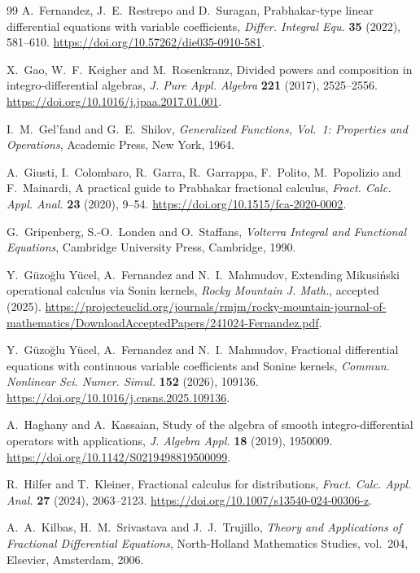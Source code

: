 \documentclass[11pt]{article}
\numberwithin{equation}{section}
\theoremstyle{definition}
\theoremstyle{remark}
\begin{document}
\begin{thebibliography}{99}
A.~Fernandez, J.~E.~Restrepo and D.~Suragan,
Prabhakar-type linear differential equations with variable coefficients,
\emph{Differ. Integral Equ.} \textbf{35} (2022), 581--610.
\url{https://doi.org/10.57262/die035-0910-581}.

X.~Gao, W.~F.~Keigher and M.~Rosenkranz,
Divided powers and composition in integro-differential algebras,
\emph{J. Pure Appl. Algebra} \textbf{221} (2017), 2525--2556.
\url{https://doi.org/10.1016/j.jpaa.2017.01.001}.

I.~M.~Gel'fand and G.~E.~Shilov,
\emph{Generalized Functions, Vol.~1: Properties and Operations},
Academic Press, New York, 1964.

A.~Giusti, I.~Colombaro, R.~Garra, R.~Garrappa, F.~Polito, M.~Popolizio and F.~Mainardi,
A practical guide to Prabhakar fractional calculus,
\emph{Fract. Calc. Appl. Anal.} \textbf{23} (2020), 9--54.
\url{https://doi.org/10.1515/fca-2020-0002}.

G.~Gripenberg, S.-O.~Londen and O.~Staffans,
\emph{Volterra Integral and Functional Equations},
Cambridge University Press, Cambridge, 1990.

Y.~G\"uzo\u{g}lu Y\"ucel, A.~Fernandez and N.~I.~Mahmudov,
Extending Mikusi\'nski operational calculus via Sonin kernels,
\emph{Rocky Mountain J. Math.}, accepted (2025).
\url{https://projecteuclid.org/journals/rmjm/rocky-mountain-journal-of-mathematics/DownloadAcceptedPapers/241024-Fernandez.pdf}.

Y.~G\"uzo\u{g}lu Y\"ucel, A.~Fernandez and N.~I.~Mahmudov,
Fractional differential equations with continuous variable coefficients and Sonine kernels,
\emph{Commun. Nonlinear Sci. Numer. Simul.} \textbf{152} (2026), 109136.
\url{https://doi.org/10.1016/j.cnsns.2025.109136}.

A.~Haghany and A.~Kassaian,
Study of the algebra of smooth integro-differential operators with applications,
\emph{J. Algebra Appl.} \textbf{18} (2019), 1950009.
\url{https://doi.org/10.1142/S0219498819500099}.

R.~Hilfer and T.~Kleiner,
Fractional calculus for distributions,
\emph{Fract. Calc. Appl. Anal.} \textbf{27} (2024), 2063--2123.
\url{https://doi.org/10.1007/s13540-024-00306-z}.

A.~A.~Kilbas, H.~M.~Srivastava and J.~J.~Trujillo,
\emph{Theory and Applications of Fractional Differential Equations},
North-Holland Mathematics Studies, vol.~204, Elsevier, Amsterdam, 2006.


\end{thebibliography}
\end{document}
